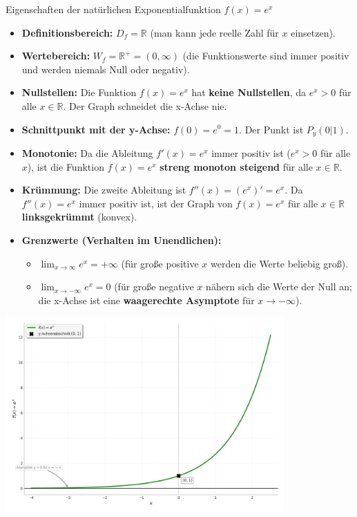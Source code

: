 \begin{merksatzumgebung}{Eigenschaften der natürlichen Exponentialfunktion $f(x)=e^x$}
\begin{itemize}
    \item \textbf{Definitionsbereich:} $D_f = \mathbb{R}$ (man kann jede reelle Zahl für $x$ einsetzen).
    \item \textbf{Wertebereich:} $W_f = \mathbb{R}^+ = (0, \infty)$ (die Funktionswerte sind immer positiv und werden niemals Null oder negativ).
    \item \textbf{Nullstellen:} Die Funktion $f(x)=e^x$ hat \textbf{keine Nullstellen}, da $e^x > 0$ für alle $x \in \mathbb{R}$. Der Graph schneidet die x-Achse nie.
    \item \textbf{Schnittpunkt mit der y-Achse:} $f(0) = e^0 = 1$. Der Punkt ist $P_y(0|1)$.
    \item \textbf{Monotonie:} Da die Ableitung $f'(x)=e^x$ immer positiv ist ($e^x > 0$ für alle $x$), ist die Funktion $f(x)=e^x$ \textbf{streng monoton steigend} für alle $x \in \mathbb{R}$.
    \item \textbf{Krümmung:} Die zweite Ableitung ist $f''(x)=(e^x)'=e^x$. Da $f''(x)=e^x$ immer positiv ist, ist der Graph von $f(x)=e^x$ für alle $x \in \mathbb{R}$ \textbf{linksgekrümmt} (konvex).
    \item \textbf{Grenzwerte (Verhalten im Unendlichen):}
        \begin{itemize}
            \item $\lim_{x \to \infty} e^x = +\infty$ (für große positive $x$ werden die Werte beliebig groß).
            \item $\lim_{x \to -\infty} e^x = 0$ (für große negative $x$ nähern sich die Werte der Null an; die x-Achse ist eine \textbf{waagerechte Asymptote} für $x \to -\infty$).
        \end{itemize}
\end{itemize}
\end{merksatzumgebung}

\begin{center}
    \includegraphics[width=0.8\textwidth]{grafiken/Exponentialfunktion_ex.png}
    \label{fig:exp_funktion_ex}
\end{center}

